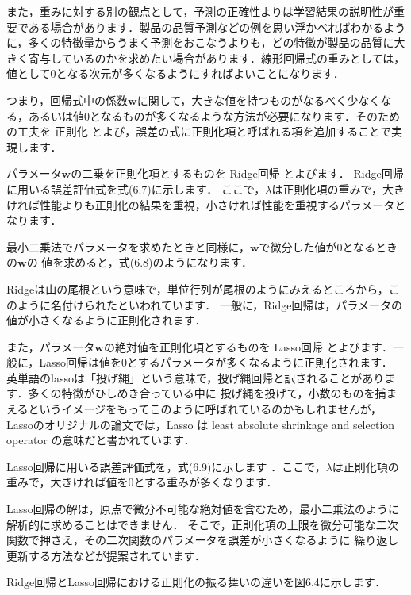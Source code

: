 また，重みに対する別の観点として，予測の正確性よりは学習結果の説明性が重要である場合があります．製品の品質予測などの例を思い浮かべればわかるように，多くの特徴量からうまく予測をおこなうよりも，どの特徴が製品の品質に大きく寄与しているのかを求めたい場合があります．線形回帰式の重みとしては，値として0となる次元が多くなるようにすればよいことになります．

つまり，回帰式中の係数$\bm{w}$に関して，大きな値を持つものがなるべく少なくなる，あるいは値0となるものが多くなるような方法が必要になります．そのための工夫を
正則化
とよび，誤差の式に正則化項と呼ばれる項を追加することで実現します．

パラメータ$\bm{w}$の二乗を正則化項とするものを
Ridge回帰
とよびます．
Ridge回帰に用いる誤差評価式を式(6.7)に示します．
ここで，$\lambda$は正則化項の重みで，大きければ性能よりも正則化の結果を重視，小さければ性能を重視するパラメータとなります．


最小二乗法でパラメータを求めたときと同様に，$\bm{w}$で微分した値が0となるときの$\bm{w}$の
値を求めると，式(6.8)のようになります．


Ridgeは山の尾根という意味で，単位行列が尾根のようにみえるところから，このように名付けられたといわれています．
一般に，Ridge回帰は，パラメータの値が小さくなるように正則化されます．


また，パラメータ$\bm{w}$の絶対値を正則化項とするものを
Lasso回帰
とよびます．一般に，Lasso回帰は値を0とするパラメータが多くなるように正則化されます．
英単語のlassoは「投げ縄」という意味で，投げ縄回帰と訳されることがあります．多くの特徴がひしめき合っている中に
投げ縄を投げて，小数のものを捕まえるというイメージをもってこのように呼ばれているのかもしれませんが，
Lassoのオリジナルの論文では，Lasso は least absolute shrinkage and selection operator の意味だと書かれています．

Lasso回帰に用いる誤差評価式を，式(6.9)に示します
．ここで，$\lambda$は正則化項の重みで，大きければ値を0とする重みが多くなります．


Lasso回帰の解は，原点で微分不可能な絶対値を含むため，最小二乗法のように解析的に求めることはできません．
そこで，正則化項の上限を微分可能な二次関数で押さえ，その二次関数のパラメータを誤差が小さくなるように
繰り返し更新する方法などが提案されています．


Ridge回帰とLasso回帰における正則化の振る舞いの違いを図6.4に示します．

